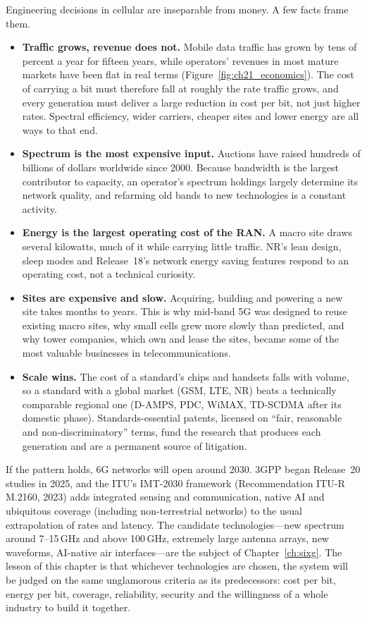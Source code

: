 Engineering decisions in cellular are inseparable from money. A few facts frame them.
\begin{itemize}
\item \textbf{Traffic grows, revenue does not.} Mobile data traffic has grown by tens of percent a
year for fifteen years, while operators' revenues in most mature markets have been flat in real
terms (Figure~\ref{fig:ch21_economics}). The cost of carrying a bit must therefore fall at roughly
the rate traffic grows, and every generation must deliver a large reduction in cost per bit, not just
higher rates. Spectral efficiency, wider carriers, cheaper sites and lower energy are all ways to
that end.
\item \textbf{Spectrum is the most expensive input.} Auctions have raised hundreds of billions of
dollars worldwide since 2000. Because bandwidth is the largest contributor to capacity, an operator's
spectrum holdings largely determine its network quality, and refarming old bands to new technologies
is a constant activity.
\item \textbf{Energy is the largest operating cost of the RAN.} A macro site draws several kilowatts,
much of it while carrying little traffic. NR's lean design, sleep modes and Release~18's network
energy saving features respond to an operating cost, not a technical curiosity.
\item \textbf{Sites are expensive and slow.} Acquiring, building and powering a new site takes months
to years. This is why mid-band 5G was designed to reuse existing macro sites, why small cells grew
more slowly than predicted, and why tower companies, which own and lease the sites, became some of
the most valuable businesses in telecommunications.
\item \textbf{Scale wins.} The cost of a standard's chips and handsets falls with volume, so a standard
with a global market (GSM, LTE, NR) beats a technically comparable regional one (D-AMPS, PDC, WiMAX,
TD-SCDMA after its domestic phase). Standards-essential patents, licensed on ``fair, reasonable and
non-discriminatory'' terms, fund the research that produces each generation and are a permanent
source of litigation.
\end{itemize}

\begin{inpractice}
If the pattern holds, 6G networks will open around 2030. 3GPP began Release~20 studies in 2025, and
the ITU's IMT-2030 framework (Recommendation ITU-R M.2160, 2023) adds integrated sensing and
communication, native AI and ubiquitous coverage (including non-terrestrial networks) to the usual
extrapolation of rates and latency. The candidate technologies---new spectrum around 7--15\,GHz and
above 100\,GHz, extremely large antenna arrays, new waveforms, AI-native air interfaces---are the
subject of Chapter~\ref{ch:sixg}. The lesson of this chapter is that whichever technologies are
chosen, the system will be judged on the same unglamorous criteria as its predecessors: cost per bit,
energy per bit, coverage, reliability, security and the willingness of a whole industry to build it
together.
\end{inpractice}

